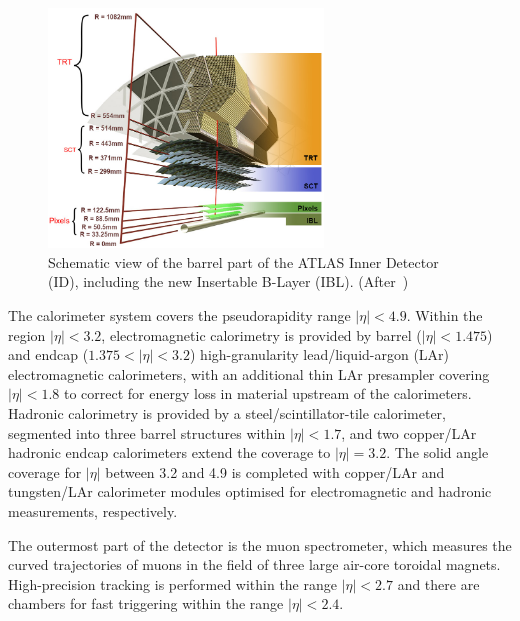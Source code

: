 \begin{figure}[!htbp]
\centering
\includegraphics[width=0.65\textwidth]{ATLAS_ID.png}
\caption{\label{fig:ATLASID}Schematic view of the  barrel part of the ATLAS Inner Detector (ID), including the new Insertable B-Layer (IBL). (After~\cite{Potamianos:2016ptf})}
\end{figure}


The calorimeter system covers the pseudorapidity range $|\eta| < 4.9$.
Within the region $|\eta|< 3.2$, electromagnetic calorimetry is provided by barrel ($|\eta| < 1.475$) and
endcap ($1.375 < |\eta| < 3.2$) high-granularity lead/liquid-argon (LAr) electromagnetic calorimeters,
with an additional thin LAr presampler covering $|\eta| < 1.8$ to correct for energy loss in material upstream of the calorimeters.
Hadronic calorimetry is provided by a steel/scintillator-tile calorimeter, segmented into three barrel structures within $|\eta| < 1.7$, and two copper/LAr hadronic endcap calorimeters extend the coverage to $|\eta|=3.2$.
The solid angle coverage for $|\eta|$ between 3.2 and 4.9 is completed with copper/LAr and tungsten/LAr calorimeter modules optimised for electromagnetic and hadronic measurements, respectively.

The outermost part of the detector is the muon spectrometer, which measures the curved trajectories of muons in the field of three large air-core toroidal magnets. High-precision tracking is performed within the range $|\eta| < 2.7$ and there are chambers for fast triggering within the range $|\eta| < 2.4$.

